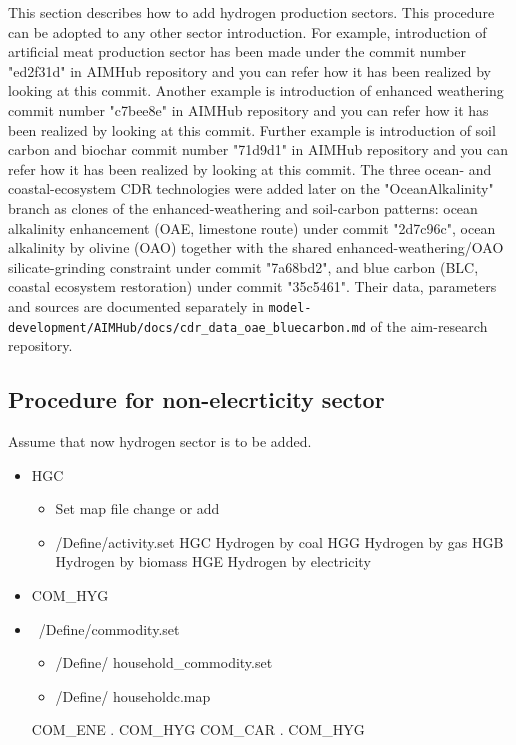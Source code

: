 \documentclass[10pt,a4paper,titlepage,dvipdfmx]{book}
\begin{document}
This section describes how to add hydrogen production sectors. This procedure can be adopted to any other sector introduction. 
For example, introduction of artificial meat production sector has been made under the commit number  "ed2f31d"  in AIMHub repository and you can refer how it has been realized by looking at this commit.
Another example is introduction of enhanced weathering commit number "c7bee8e" in AIMHub repository and you can refer how it has been realized by looking at this commit.
Further example is introduction of soil carbon and biochar commit number "71d9d1" in AIMHub repository and you can refer how it has been realized by looking at this commit.
The three ocean- and coastal-ecosystem CDR technologies were added later on the "OceanAlkalinity" branch as clones of the enhanced-weathering and soil-carbon patterns: ocean alkalinity enhancement (OAE, limestone route) under commit "2d7c96c", ocean alkalinity by olivine (OAO) together with the shared enhanced-weathering/OAO silicate-grinding constraint under commit "7a68bd2", and blue carbon (BLC, coastal ecosystem restoration) under commit "35c5461". Their data, parameters and sources are documented separately in \texttt{model-development/AIMHub/docs/cdr\_data\_oae\_bluecarbon.md} of the aim-research repository.


\subsection{\label{subsec:ProNonEleSec}Procedure for non-elecrticity sector}

Assume that now hydrogen sector is to be added.
\begin{itemize}
\item HGC
\begin{itemize}
\item Set map file change or add

\item /Define/activity.set
      HGC Hydrogen by coal
      HGG Hydrogen by gas
      HGB Hydrogen by biomass
      HGE Hydrogen by electricity
\end{itemize}

\item COM\_HYG
\item ~/Define/commodity.set
\begin{itemize}
\item /Define/ household\_commodity.set
\item /Define/ householdc.map
\end{itemize}
COM\_ENE . COM\_HYG
COM\_CAR . COM\_HYG
\end{itemize}
\end{document}
